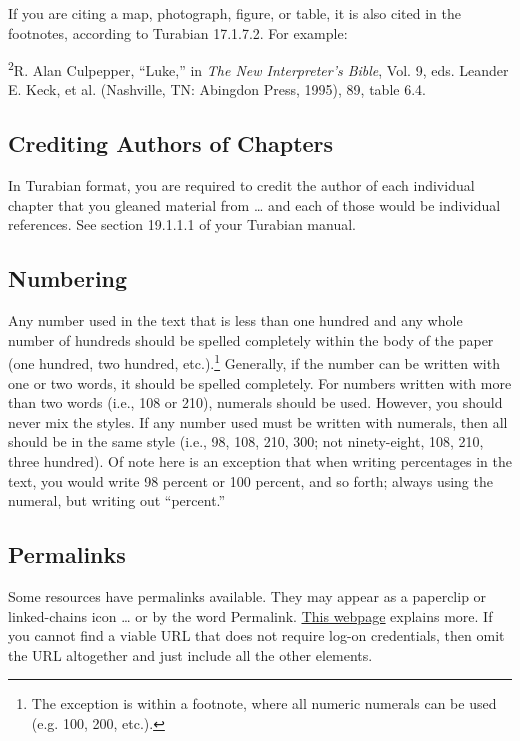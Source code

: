 \documentclass[raggedright]{turabian-researchpaper}
\newcommand*{\bluehref}[2]{\href{#1}{\color{blue}\ul{#2}}}
\begin{document}
If you are citing a map, photograph, figure, or table, it is also cited in the
footnotes, according to Turabian 17.1.7.2. For example:

\begin{singlespace}
\textsuperscript{2}R. Alan Culpepper, ``Luke,'' in \textit{The New Interpreter's
Bible}, Vol. 9, eds. Leander E. Keck, et al. (Nashville, TN: Abingdon Press,
1995), 89, table 6.4.
\end{singlespace}

\subsection{Crediting Authors of Chapters}

In Turabian format, you are required to credit the author of each individual
chapter that you gleaned material from \dots{} and each of those would be
individual references. See section 19.1.1.1 of your Turabian
manual.\autocite[232]{Turabian}

\subsection{Numbering}

Any number used in the text that is less than one hundred and any whole number
of hundreds should be spelled completely within the body of the paper (one
hundred, two hundred, etc.).\footnote{The exception is within a footnote, where
all numeric numerals can be used (e.g. 100, 200, etc.).} Generally, if the
number can be written with one or two words, it should be spelled completely.
For numbers written with more than two words (i.e., 108 or 210), numerals should
be used. However, you should never mix the styles. If any number used must be
written with numerals, then all should be in the same style (i.e., 98, 108, 210,
300; not ninety-eight, 108, 210, three hundred). Of note here is an exception
that when writing percentages in the text, you would write 98 percent or 100
percent, and so forth; always using the numeral, but writing out ``percent.''

\subsection{Permalinks}

Some resources have permalinks available. They may appear as a paperclip or
linked-chains icon \dots{} or by the word Permalink.
\bluehref{http://umuc.edu/library/libhow/linking.cfm}{This webpage} explains
more. If you cannot find a viable URL that does not require log-on credentials,
then omit the URL altogether and just include all the other elements.
\end{document}
